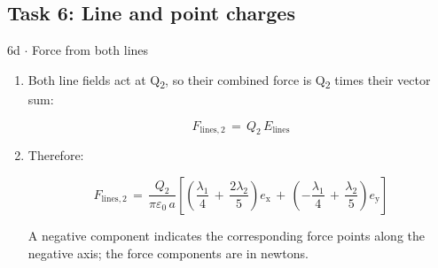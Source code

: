 \documentclass[11pt]{article}
\begin{document}
\begin{keepsection}\subsection{Task 6: Line and point charges}

\begin{workedbox}{6d \ensuremath{\cdot} Force from both lines}
\begin{enumerate}
\item {}
Both line fields act at Q\textsubscript{2}, so their combined force is Q\textsubscript{2} times their vector sum:

\begin{equation*}{F}_{\text{lines},2}\, =\, {Q}_{2}\, {E}_{\text{lines}}\end{equation*}
\item {}
Therefore:

\begin{equation*}{F}_{\text{lines},2}\, =\, \dfrac{{Q}_{2}}{πε_{0}\, {a}}\left[\left(\dfrac{λ_{1}}{4}\, +\, \dfrac{2λ_{2}}{5}\right){e}_{\mathrm{x}}\, +\, \left(-\dfrac{λ_{1}}{4}\, +\, \dfrac{λ_{2}}{5}\right){e}_{\mathrm{y}}\right]\end{equation*}

A negative component indicates the corresponding force points along the negative axis; the force components are in newtons.
\end{enumerate}
\end{workedbox}

\end{keepsection}
\end{document}
